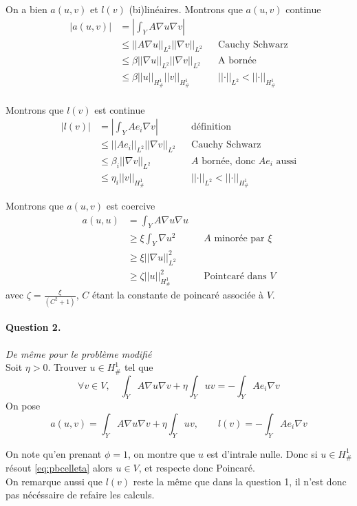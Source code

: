 \documentclass[11pt]{article}
\newcommand{\norm}[1]{\left|\left|#1\right|\right|}
\newcommand{\question}[2]{\paragraph{Question #1.}\textit{#2} \\}
\newcommand{\Hd}{H^1_{\#}}
\begin{document}
On a bien $a(u,v)$ et $l(v)$ (bi)linéaires. Montrons que $a(u,v)$ continue 
\begin{align*}
  \big|a(u,v)\big| &= \left| \int_Y A \nabla u \nabla v \right| \\
                   &\leq \norm{A\nabla u}_{L^2} \norm{\nabla v}_{L^2} && \mbox{Cauchy Schwarz} \\
                   &\leq \beta \norm{\nabla u}_{L^2} \norm{\nabla v}_{L^2} && \mbox{A bornée} \\
                   &\leq \beta \norm{u}_{\Hd} \norm{v}_{\Hd} && \norm{\cdot}_{L^2}<\norm{\cdot}_{\Hd} \\
\end{align*}

Montrons que $l(v)$ est continue
\begin{align*}
  \big|l(v)\big| &= \left| \int_Y A e_i \nabla v \right|  && \text{définition} \\
                 &\leq \norm{Ae_i}_{L^2} \norm{\nabla v}_{L^2} && \text{Cauchy Schwarz} \\
                 &\leq \beta_i \norm{\nabla v}_{L^2} && \text{$A$ bornée, donc $A e_i$ aussi} \\
                 &\leq \eta_i \norm{v}_{\Hd} && \norm{\cdot}_{L^2}<\norm{\cdot}_{\Hd}
\end{align*}

Montrons que $a(u,v)$ est coercive
\begin{align*}
  a(u,u) &= \int_Y A \nabla u  \nabla u \\
         &\geq \xi \int_Y \nabla u^2  && \text{$A$ minorée par $\xi$}\\
         &\geq \xi \norm{\nabla u}^2_{L^2} \\
         &\geq \zeta \norm{u}^2_{\Hd} && \text{Pointcaré dans $V$} 
\end{align*}
avec $\zeta = \frac{\xi}{(C^2+1)}$, $C$ étant la constante de poincaré associée à $V$.


\question{2}{De même pour le problème modifié}
Soit $\eta>0$. Trouver $u \in \Hd$ tel que
\begin{equation}
  \label{eq:pbcelleta}
  \forall v \in V, \quad \int_Y A \nabla u \nabla v + \eta \int_Y u v = - \int_Y A e_i \nabla v
\end{equation}
On pose
\[
  a(u,v) = \int_Y A \nabla u \nabla v + \eta \int_Y u v, \qquad
  l(v) = -\int_Y A e_i \nabla v
\]

On note qu'en prenant $\phi=1$, on montre que $u$ est d'intrale nulle. Donc si $u\in\Hd$ résout \autoref{eq:pbcelleta} alors $u\in V$, et respecte donc Poincaré.  \\
On remarque aussi que $l(v)$ reste la même que dans la question 1, il n'est donc pas nécéssaire de refaire les calculs. 
\end{document}

